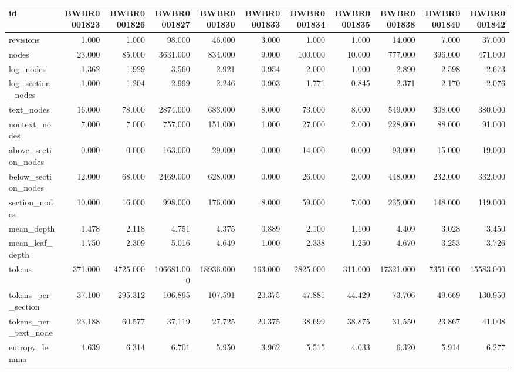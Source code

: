 \begin{tabular}{lrrrrrrrrrr}
\toprule
id & BWBR0001823 & BWBR0001826 & BWBR0001827 & BWBR0001830 & BWBR0001833 & BWBR0001834 & BWBR0001835 & BWBR0001838 & BWBR0001840 & BWBR0001842 \\
\midrule
revisions & 1.000 & 1.000 & 98.000 & 46.000 & 3.000 & 1.000 & 1.000 & 14.000 & 7.000 & 37.000 \\
\cline{1-11}
nodes & 23.000 & 85.000 & 3631.000 & 834.000 & 9.000 & 100.000 & 10.000 & 777.000 & 396.000 & 471.000 \\
\cline{1-11}
log\_nodes & 1.362 & 1.929 & 3.560 & 2.921 & 0.954 & 2.000 & 1.000 & 2.890 & 2.598 & 2.673 \\
\cline{1-11}
log\_section\_nodes & 1.000 & 1.204 & 2.999 & 2.246 & 0.903 & 1.771 & 0.845 & 2.371 & 2.170 & 2.076 \\
\cline{1-11}
text\_nodes & 16.000 & 78.000 & 2874.000 & 683.000 & 8.000 & 73.000 & 8.000 & 549.000 & 308.000 & 380.000 \\
\cline{1-11}
nontext\_nodes & 7.000 & 7.000 & 757.000 & 151.000 & 1.000 & 27.000 & 2.000 & 228.000 & 88.000 & 91.000 \\
\cline{1-11}
above\_section\_nodes & 0.000 & 0.000 & 163.000 & 29.000 & 0.000 & 14.000 & 0.000 & 93.000 & 15.000 & 19.000 \\
\cline{1-11}
below\_section\_nodes & 12.000 & 68.000 & 2469.000 & 628.000 & 0.000 & 26.000 & 2.000 & 448.000 & 232.000 & 332.000 \\
\cline{1-11}
section\_nodes & 10.000 & 16.000 & 998.000 & 176.000 & 8.000 & 59.000 & 7.000 & 235.000 & 148.000 & 119.000 \\
\cline{1-11}
mean\_depth & 1.478 & 2.118 & 4.751 & 4.375 & 0.889 & 2.100 & 1.100 & 4.409 & 3.028 & 3.450 \\
\cline{1-11}
mean\_leaf\_depth & 1.750 & 2.309 & 5.016 & 4.649 & 1.000 & 2.338 & 1.250 & 4.670 & 3.253 & 3.726 \\
\cline{1-11}
tokens & 371.000 & 4725.000 & 106681.000 & 18936.000 & 163.000 & 2825.000 & 311.000 & 17321.000 & 7351.000 & 15583.000 \\
\cline{1-11}
tokens\_per\_section & 37.100 & 295.312 & 106.895 & 107.591 & 20.375 & 47.881 & 44.429 & 73.706 & 49.669 & 130.950 \\
\cline{1-11}
tokens\_per\_text\_node & 23.188 & 60.577 & 37.119 & 27.725 & 20.375 & 38.699 & 38.875 & 31.550 & 23.867 & 41.008 \\
\cline{1-11}
entropy\_lemma & 4.639 & 6.314 & 6.701 & 5.950 & 3.962 & 5.515 & 4.033 & 6.320 & 5.914 & 6.277 \\

\end{tabular}
